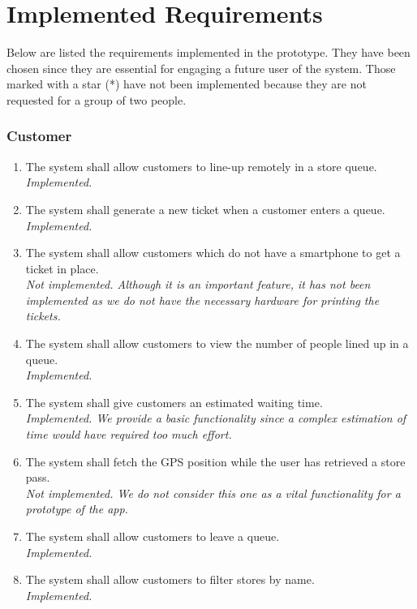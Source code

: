 \chapter{Implemented Requirements}
Below are listed the requirements implemented in the prototype. They have been chosen since they are essential for engaging a future user of the system.\newline
Those marked with a star (*) have not been implemented because they are not requested for a group of two people.

\subsection{Customer}
\begin{enumerate}[series=requirements, label=\textbf{R.\arabic*}]
    \item The system shall allow customers to line-up remotely in a store queue.\\[4pt] \textit{Implemented.}
    \item The system shall generate a new ticket when a customer enters a queue.\\[4pt] \textit{Implemented.}
    \item The system shall allow customers which do not have a smartphone to get a ticket in place.\\[4pt] \textit{Not implemented. Although it is an important feature, it has not been implemented as we do not have the necessary hardware for printing the tickets.}
    \item The system shall allow customers to view the number of people lined up in a queue.\\[4pt] \textit{Implemented.}
    \item The system shall give customers an estimated waiting time.\\[4pt] \textit{Implemented. We provide a basic functionality since a complex estimation of time would have required too much effort.}
    \item The system shall fetch the GPS position while the user has retrieved a store pass.\\[4pt] \textit{Not implemented. We do not consider this one as a vital functionality for a prototype of the app.}
    \item The system shall allow customers to leave a queue.\\[4pt] \textit{Implemented.}
    \item The system shall allow customers to filter stores by name.\\[4pt] \textit{Implemented.}\newline

\end{enumerate}
